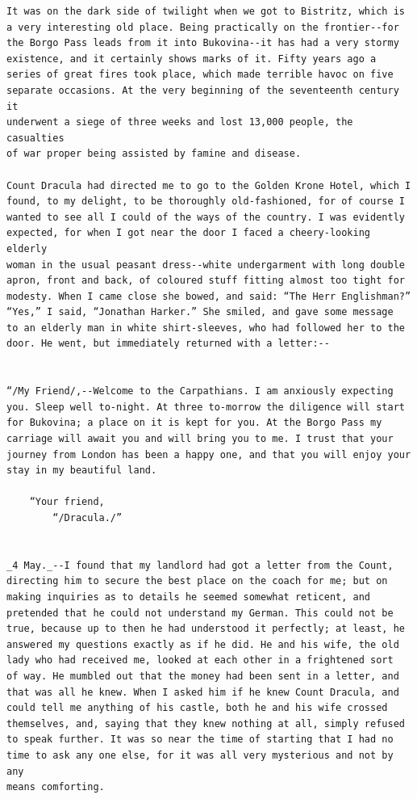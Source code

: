 \documentclass{article}
\begin{document}
\begin{verbatim}
It was on the dark side of twilight when we got to Bistritz, which is
a very interesting old place. Being practically on the frontier--for
the Borgo Pass leads from it into Bukovina--it has had a very stormy
existence, and it certainly shows marks of it. Fifty years ago a
series of great fires took place, which made terrible havoc on five
separate occasions. At the very beginning of the seventeenth century it
underwent a siege of three weeks and lost 13,000 people, the casualties
of war proper being assisted by famine and disease.

Count Dracula had directed me to go to the Golden Krone Hotel, which I
found, to my delight, to be thoroughly old-fashioned, for of course I
wanted to see all I could of the ways of the country. I was evidently
expected, for when I got near the door I faced a cheery-looking elderly
woman in the usual peasant dress--white undergarment with long double
apron, front and back, of coloured stuff fitting almost too tight for
modesty. When I came close she bowed, and said: “The Herr Englishman?”
“Yes,” I said, “Jonathan Harker.” She smiled, and gave some message
to an elderly man in white shirt-sleeves, who had followed her to the
door. He went, but immediately returned with a letter:--


“/My Friend/,--Welcome to the Carpathians. I am anxiously expecting
you. Sleep well to-night. At three to-morrow the diligence will start
for Bukovina; a place on it is kept for you. At the Borgo Pass my
carriage will await you and will bring you to me. I trust that your
journey from London has been a happy one, and that you will enjoy your
stay in my beautiful land.

    “Your friend,
        “/Dracula./”


_4 May._--I found that my landlord had got a letter from the Count,
directing him to secure the best place on the coach for me; but on
making inquiries as to details he seemed somewhat reticent, and
pretended that he could not understand my German. This could not be
true, because up to then he had understood it perfectly; at least, he
answered my questions exactly as if he did. He and his wife, the old
lady who had received me, looked at each other in a frightened sort
of way. He mumbled out that the money had been sent in a letter, and
that was all he knew. When I asked him if he knew Count Dracula, and
could tell me anything of his castle, both he and his wife crossed
themselves, and, saying that they knew nothing at all, simply refused
to speak further. It was so near the time of starting that I had no
time to ask any one else, for it was all very mysterious and not by any
means comforting.


\end{verbatim}
\end{document}

